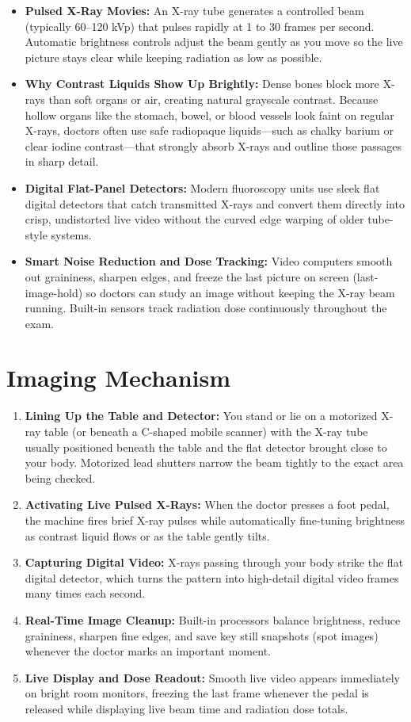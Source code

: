 \begin{itemize}
    \item \textbf{Pulsed X-Ray Movies:} An X-ray tube generates a controlled beam (typically 60--120 kVp) that pulses rapidly at 1 to 30 frames per second. Automatic brightness controls adjust the beam gently as you move so the live picture stays clear while keeping radiation as low as possible.
    \item \textbf{Why Contrast Liquids Show Up Brightly:} Dense bones block more X-rays than soft organs or air, creating natural grayscale contrast. Because hollow organs like the stomach, bowel, or blood vessels look faint on regular X-rays, doctors often use safe radiopaque liquids---such as chalky barium or clear iodine contrast---that strongly absorb X-rays and outline those passages in sharp detail.
    \item \textbf{Digital Flat-Panel Detectors:} Modern fluoroscopy units use sleek flat digital detectors that catch transmitted X-rays and convert them directly into crisp, undistorted live video without the curved edge warping of older tube-style systems.
    \item \textbf{Smart Noise Reduction and Dose Tracking:} Video computers smooth out graininess, sharpen edges, and freeze the last picture on screen (last-image-hold) so doctors can study an image without keeping the X-ray beam running. Built-in sensors track radiation dose continuously throughout the exam.
\end{itemize}

\section{Imaging Mechanism}

\begin{enumerate}
    \item \textbf{Lining Up the Table and Detector:} You stand or lie on a motorized X-ray table (or beneath a C-shaped mobile scanner) with the X-ray tube usually positioned beneath the table and the flat detector brought close to your body. Motorized lead shutters narrow the beam tightly to the exact area being checked.
    \item \textbf{Activating Live Pulsed X-Rays:} When the doctor presses a foot pedal, the machine fires brief X-ray pulses while automatically fine-tuning brightness as contrast liquid flows or as the table gently tilts.
    \item \textbf{Capturing Digital Video:} X-rays passing through your body strike the flat digital detector, which turns the pattern into high-detail digital video frames many times each second.
    \item \textbf{Real-Time Image Cleanup:} Built-in processors balance brightness, reduce graininess, sharpen fine edges, and save key still snapshots (spot images) whenever the doctor marks an important moment.
    \item \textbf{Live Display and Dose Readout:} Smooth live video appears immediately on bright room monitors, freezing the last frame whenever the pedal is released while displaying live beam time and radiation dose totals.
\end{enumerate}

